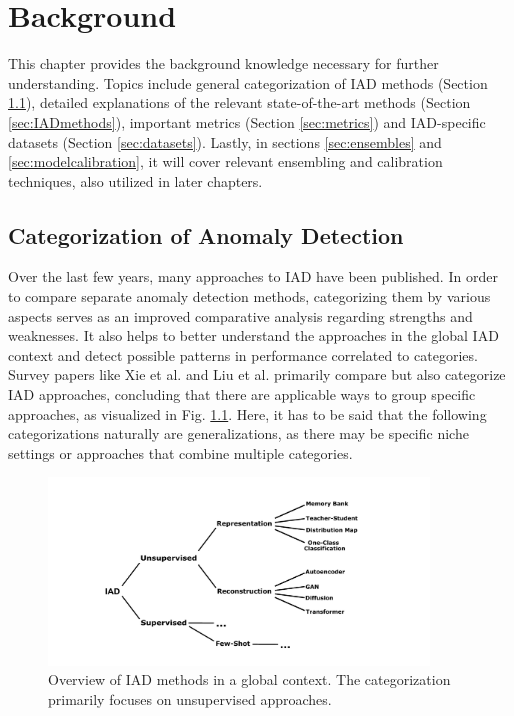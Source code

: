 \chapter{Background}
\label{chap:background}

This chapter provides the background knowledge necessary for further understanding. Topics include general categorization of IAD methods (Section \ref{sec:IADcategs}), detailed explanations of the relevant 
state-of-the-art methods (Section \ref{sec:IADmethods}), important metrics (Section \ref{sec:metrics}) and IAD-specific datasets (Section \ref{sec:datasets}). Lastly, in 
sections \ref{sec:ensembles} and \ref{sec:modelcalibration}, 
it will cover relevant ensembling and calibration techniques, also utilized in later chapters.



\section{Categorization of Anomaly Detection}
\label{sec:IADcategs}
Over the last few years, many approaches to IAD have been published. In order to compare separate anomaly detection methods, categorizing them by various 
aspects serves as an improved comparative analysis regarding strengths and weaknesses. It also helps to better understand the approaches in the global IAD context and
detect possible patterns in performance correlated to categories. Survey papers like Xie et al. \cite{Xie_2024benchmarking} and 
Liu et al.
\cite{liu2024deep} primarily compare but also categorize IAD approaches, concluding that there are applicable ways to group specific approaches, as 
visualized in Fig. \ref{fig:IADcategstree}. Here, it has to be said that the following categorizations naturally are generalizations, as there may be specific niche settings or approaches that combine multiple categories.


\begin{figure}[H]
\centering
\includegraphics[width=0.9\textwidth]{figures/Wald.pdf}
\caption{Overview of IAD methods in a global context. The categorization primarily focuses on unsupervised approaches.}
\label{fig:IADcategstree}
\end{figure}

